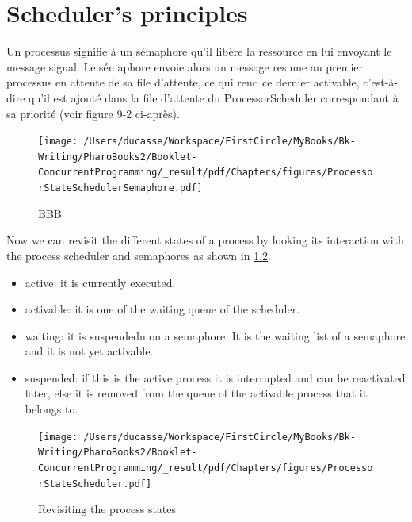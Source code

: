 \documentclass[10pt,twoside,english]{_support/latex/sbabook/sbabook}
\begin{document}
\chapter{Scheduler's principles}
Un processus signifie \`{a} un s\'{e}maphore qu’il lib\`{e}re la ressource en lui envoyant le message signal. 
Le s\'{e}maphore envoie alors un message resume au premier processus en attente de sa file d’attente, 
ce qui rend ce dernier activable, c’est-\`{a}-dire qu’il est ajout\'{e} dans la file d’attente du 
ProcessorScheduler correspondant \`{a} sa priorit\'{e} (voir figure 9-2 ci-apr\`{e}s).


\begin{figure}

\begin{center}
\texttt{[image: /Users/ducasse/Workspace/FirstCircle/MyBooks/Bk-Writing/PharoBooks2/Booklet-ConcurrentProgramming/\_result/pdf/Chapters/figures/ProcessorStateSchedulerSemaphore.pdf]}\caption{BBB\label{ProcessorStateSchedulerSemaphore}}\end{center}
\end{figure}


Now we can revisit the different states of a process by looking its interaction with the process scheduler and 
semaphores as shown in \ref{ProcessorStateScheduler}.

\begin{itemize}
\item active: it is currently executed.
\item activable: it is one of the waiting queue of the scheduler.
\item waiting: it is suspendedn on a semaphore. It is the waiting list of a semaphore and it is not yet activable.
\item suspended: if this is the active process it is interrupted and can be reactivated later, else it is removed from the queue of the activable process that it belongs to. 
\end{itemize}


\begin{figure}

\begin{center}
\texttt{[image: /Users/ducasse/Workspace/FirstCircle/MyBooks/Bk-Writing/PharoBooks2/Booklet-ConcurrentProgramming/\_result/pdf/Chapters/figures/ProcessorStateScheduler.pdf]}\caption{Revisiting the process states\label{ProcessorStateScheduler}}\end{center}
\end{figure}
\end{document}
